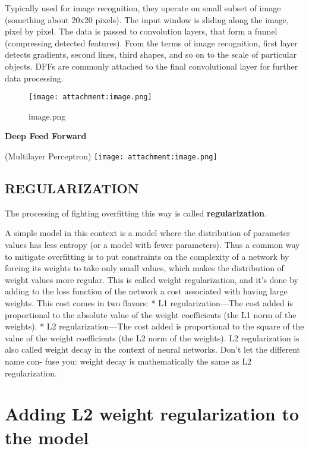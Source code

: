 \documentclass[11pt]{article}
\makeatletter
\def\maxwidth{\ifdim\Gin@nat@width>\linewidth\linewidth
    \else\Gin@nat@width\fi}
\let\Oldincludegraphics\includegraphics
\renewcommand{\includegraphics}[1]{\Oldincludegraphics[width=.8\maxwidth]{#1}}
\makeatother
\begin{document}
Typically used for image recognition, they operate on small subset of
image (something about 20x20 pixels). The input window is sliding along
the image, pixel by pixel. The data is passed to convolution layers,
that form a funnel (compressing detected features). From the terms of
image recognition, first layer detects gradients, second lines, third
shapes, and so on to the scale of particular objects. DFFs are commonly
attached to the final convolutional layer for further data processing.

\begin{figure}
\centering
\texttt{[image: attachment:image.png]}
\caption{image.png}
\end{figure}

\textbf{Deep Feed Forward}

(Multilayer Perceptron) \texttt{[image: attachment:image.png]}

    \hypertarget{regularization}{%
\subsection{REGULARIZATION}\label{regularization}}

The processing of fighting overfitting this way is called
\textbf{regularization}.

A simple model in this context is a model where the distribution of
parameter values has less entropy (or a model with fewer parameters).
Thus a common way to mitigate overfitting is to put constraints on the
complexity of a network by forcing its weights to take only small
values, which makes the distribution of weight values more regular. This
is called weight regularization, and it's done by adding to the loss
function of the network a cost associated with having large weights.
This cost comes in two flavors: * L1 regularization---The cost added is
proportional to the absolute value of the weight coefficients (the L1
norm of the weights). * L2 regularization---The cost added is
proportional to the square of the value of the weight coefficients (the
L2 norm of the weights). L2 regularization is also called weight decay
in the context of neural networks. Don't let the different name con-
fuse you: weight decay is mathematically the same as L2 regularization.

    \hypertarget{adding-l2-weight-regularization-to-the-model}{%
\section{Adding L2 weight regularization to the
model}\label{adding-l2-weight-regularization-to-the-model}}
\end{document}
